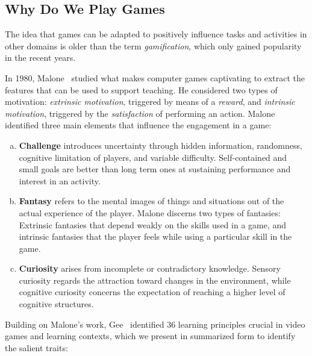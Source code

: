 \subsection{Why Do We Play Games} \label{sec:gamification-principles:games}

The  idea that games can be adapted to positively influence tasks and activities in other domains is older than the term \emph{gamification}, which only gained popularity in the recent years.

In 1980, Malone~\cite{Malone1980} studied what makes computer games captivating to extract the features that can be used to support teaching.
He considered two types of motivation: \emph{extrinsic motivation}, triggered by means of a \emph{reward}, and \emph{intrinsic motivation}, triggered by the \emph{satisfaction} of performing an action.
Malone identified three main elements that influence the engagement in a game:

\begin{enumerate}[(a)]

\item\textbf{Challenge} introduces uncertainty through hidden information, randomness, cognitive limitation of players, and variable difficulty.
Self-contained and small goals are better than long term ones at sustaining performance and interest in an activity.

\item\textbf{Fantasy} refers to the mental images of things and situations out of the actual experience of the player.
Malone discerns two types of fantasies: Extrinsic fantasies that depend weakly on the skills used in a game, and intrinsic fantasies that the player feels while using a particular skill in the game.

\item\textbf{Curiosity} arises from incomplete or contradictory knowledge.
Sensory curiosity regards the attraction toward changes in the environment, while cognitive curiosity concerns the expectation of reaching a higher level of cognitive structures.

\end{enumerate}

Building on Malone's work, Gee~\cite{Gee2003} identified 36 learning principles crucial in video games and learning contexts, which we present in summarized form to identify the salient traits:

